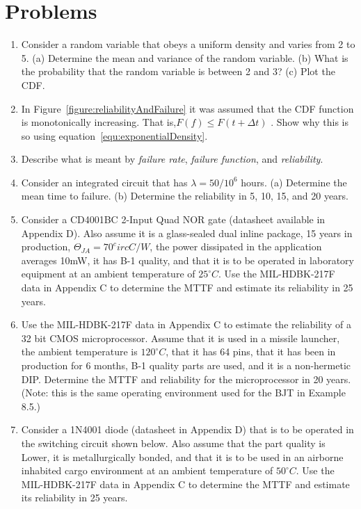 \section{Problems}
\label{section:problems}

\begin{enumerate}
\def\labelenumi{\arabic{enumi}.}
\item
  Consider a random variable that obeys a uniform density and varies
  from 2 to 5. (a) Determine the mean and variance of the random
  variable. (b) What is the probability that the random variable is
  between 2 and 3? (c) Plot the CDF.

\item
  In Figure~\ref{figure:reliabilityAndFailure}
  it was assumed that the CDF function is monotonically
  increasing. That is,$F(f) \leq F(t+\Delta t)$ . Show why this is so using 
  equation~\ref{equ:exponentialDensity}.

\item
  Describe what is meant by \emph{failure rate}, \emph{failure
  function}, and \emph{reliability}.
\item
  Consider an integrated circuit that has $\lambda=50/10^6$ hours. 
  (a) Determine the mean time
  to failure. (b) Determine the reliability in 5, 10, 15, and 20 years.

\item
  Consider a CD4001BC 2-Input Quad NOR gate (datasheet available in
  Appendix D). Also assume it is a glass-sealed dual inline package, 15
  years in production, $\Theta_{JA} = 70^circ C/W$, the
  power dissipated in the application averages 10mW, it has B-1 quality,
  and that it is to be operated in laboratory equipment at an ambient
  temperature of $25^\circ C$. Use the MIL-HDBK-217F data in Appendix C to
  determine the MTTF and estimate its reliability in 25 years.

\item
  Use the MIL-HDBK-217F data in Appendix C to estimate the reliability
  of a 32 bit CMOS microprocessor. Assume that it is used in a missile
  launcher, the ambient temperature is $120^\circ C$, that it has 64 pins, that
  it has been in production for 6 months, B-1 quality parts are used,
  and it is a non-hermetic DIP. Determine the MTTF and reliability for
  the microprocessor in 20 years. (Note: this is the same operating
  environment used for the BJT in Example 8.5.)
\item
  Consider a 1N4001 diode (datasheet in Appendix D) that is to be
  operated in the switching circuit shown below. Also assume that the
  part quality is Lower, it is metallurgically bonded, and that it is to
  be used in an airborne inhabited cargo environment at an ambient
  temperature of $50^\circ C$. Use the MIL-HDBK-217F data in Appendix C to
  determine the MTTF and estimate its reliability in 25 years.


\end{enumerate}
